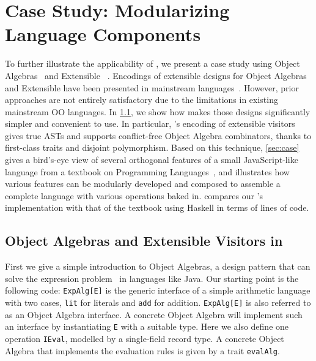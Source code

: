
\chapter{Case Study: Modularizing Language Components}
\label{chap:case_study}

To further illustrate the applicability of \sedel, we present a case
study using Object Algebras~\citep{oliveira2012extensibility} and
Extensible \visitor~\citep{oliveira09modular, togersen:2004}. Encodings
of extensible designs for Object Algebras and Extensible \visitor have
been presented in mainstream languages~\citep{oliveira09modular, togersen:2004, oliveira2012extensibility, oliveira2013feature, rendel14attributes}.
However, prior approaches are not entirely satisfactory
due to the limitations in existing mainstream OO languages. In \cref{sec:ob}, we show how \sedel makes those designs significantly simpler and
convenient to use. In particular, \sedel's encoding of extensible visitors gives true ASTs and supports
conflict-free Object Algebra combinators, thanks to first-class traits and disjoint polymorphism.
Based on this technique, \cref{sec:case} gives a bird's-eye view of several orthogonal features of
a small JavaScript-like language from a textbook on Programming
Languages~\citep{poplcook}, and illustrates how various features can
be modularly developed and composed to assemble a complete language with various
operations baked in.  compares our \sedel's implementation
with that of the textbook using Haskell in terms of lines of code.


\section{Object Algebras and Extensible Visitors in \sedel}
\label{sec:ob}

First we give a simple introduction to Object Algebras, a design pattern that
can solve the expression problem~\citep{wadler1998expression} in languages like
Java. Our starting point is the following code:
\lstinline{ExpAlg[E]} is the generic interface of a simple arithmetic language
with two cases, \lstinline{lit} for literals and \lstinline{add} for addition.
\lstinline{ExpAlg[E]} is also referred to as an Object Algebra interface. A concrete
Object Algebra will implement such an interface by instantiating \lstinline{E}
with a suitable type. Here we also define one operation \lstinline{IEval},
modelled by a single-field record type. A concrete Object Algebra that
implements the evaluation rules is given by a trait
\lstinline{evalAlg}.

